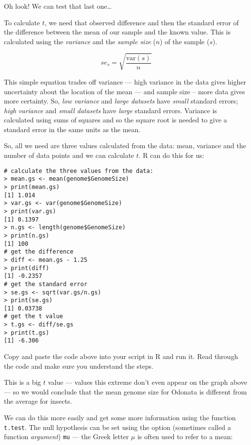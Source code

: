 Oh look! We can test that last one\ldots 

To calculate $t$, we need that observed difference and then the 
standard error of the difference between the mean of our sample and the 
known value. This is calculated using the \emph{variance} and the 
\emph{sample size} ($n$) of the sample ($s$). 

\[se_s = \sqrt{\frac{\textrm{var}(s)}{n}}\]

This simple equation trades off variance --- high variance in the data 
gives higher uncertainty about the location of the mean --- and sample 
size -- more data gives more certainty. So, \emph{low variance} and 
\emph{large datasets} have \emph{small} standard errors; \emph{high 
variance} and \emph{small datasets} have \emph{large} standard errors. 
Variance is calculated using sums of squares and so the square root is 
needed to give a standard error in the same units as the mean.  

So, all we need are three values calculated from the data: mean, 
variance and the number of data points and we can calculate $t$. R can 
do this for us:

\begin{lstlisting}
# calculate the three values from the data:
> mean.gs <- mean(genome$GenomeSize)
> print(mean.gs)
[1] 1.014
> var.gs <- var(genome$GenomeSize)
> print(var.gs)
[1] 0.1397
> n.gs <- length(genome$GenomeSize)
> print(n.gs)
[1] 100
# get the difference
> diff <- mean.gs - 1.25
> print(diff)
[1] -0.2357
# get the standard error
> se.gs <- sqrt(var.gs/n.gs)
> print(se.gs)
[1] 0.03738
# get the t value
> t.gs <- diff/se.gs
> print(t.gs)
[1] -6.306
\end{lstlisting}

\begin{compactitem}[$\quad\star$]
\item Copy and paste the code above into your script in R and run it. 
Read through the code and make sure you understand the steps.
\end{compactitem}

This is a big $t$ value --- values this extreme don't even appear on 
the graph above --- so we would conclude that the mean genome size for 
Odonata is different from the average for insects.

We can do this more easily and get some more information using the 
function {\tt t.test}. The null hypothesis can be set using the option 
(sometimes called a function \emph{argument}) {\tt mu} --- the Greek 
letter $\mu$ is often used to refer to a mean:

